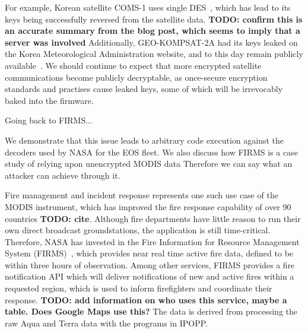 For example, Korean satellite COMS-1 uses single DES~\cite{lrit-key-dec}, which has lead to its keys being successfully reversed from the satellite data. \textbf{TODO: confirm this is an accurate summary from the blog post, which seems to imply that a server was involved}
Additionally, GEO-KOMPSAT-2A had its keys leaked on the Korea Meteorological Administration website, and to this day remain publicly available~\cite{xrit-rx}.
We should continue to expect that more encrypted satellite communications become publicly decryptable, as once-secure encryption standards and practises cause leaked keys, some of which will be irrevocably baked into the firmware.


Going back to FIRMS...

We demonstrate that this issue leads to arbitrary code execution against the decoders used by NASA for the EOS fleet.
We also discuss how FIRMS is a case study of relying upon unencrypted MODIS data
Therefore we can say what an attacker can achieve through it.



Fire management and incident response represents one such use case of the MODIS instrument, which has improved the fire response capability of over 90 countries \textbf{TODO: cite}.
Although fire departments have little reason to run their own direct broadcast groundstations, the application is still time-critical.
Therefore, NASA has invested in the Fire Information for Resource Management System (FIRMS)~\cite{firmsIndex}, which provides near real time active fire data, defined to be within three hours of observation.
Among other services, FIRMS provides a fire notification API which will deliver notifications of new and active fires within a requested region, which is used to inform firefighters and coordinate their response.
\textbf{TODO: add information on who uses this service, maybe a table. Does Google Maps use this?}
The data is derived from processing the raw Aqua and Terra data with the programs in IPOPP.

